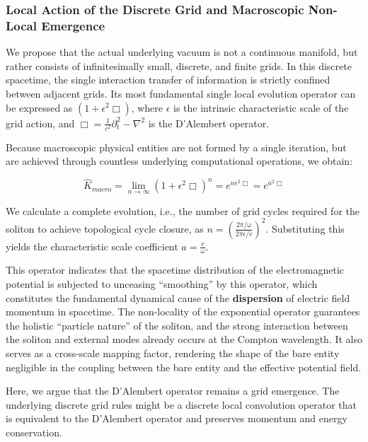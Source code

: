 \documentclass[12pt, a4paper]{article}
\begin{document}
\subsubsection{Local Action of the Discrete Grid and Macroscopic Non-Local Emergence}

We propose that the actual underlying vacuum is not a continuous manifold, but rather consists of infinitesimally small, discrete, and finite grids. In this discrete spacetime, the single interaction transfer of information is strictly confined between adjacent grids. Its most fundamental single local evolution operator can be expressed as $(1 + \epsilon^2\Box)$, where $\epsilon$ is the intrinsic characteristic scale of the grid action, and $\Box = \frac{1}{c^2}\partial_t^2 - \nabla^2$ is the D'Alembert operator.

Because macroscopic physical entities are not formed by a single iteration, but are achieved through countless underlying computational operations, we obtain:

\begin{equation}
\hat{K}_{macro} = \lim_{n\to\infty}  (1 + \epsilon^2 \Box)^n = e^{ n \epsilon^2 \Box} = e^{a^2 \Box} 
\end{equation}

We calculate a complete evolution, i.e., the number of grid cycles required for the soliton to achieve topological cycle closure, as $n = \left(\frac {2 \pi / \omega} { 2 \pi \epsilon / c}\right)^2$. Substituting this yields the characteristic scale coefficient $a = \frac{c}{\omega}$.

This operator indicates that the spacetime distribution of the electromagnetic potential is subjected to unceasing ``smoothing'' by this operator, which constitutes the fundamental dynamical cause of the \textbf{dispersion} of electric field momentum in spacetime. The non-locality of the exponential operator guarantees the holistic ``particle nature'' of the soliton, and the strong interaction between the soliton and external modes already occurs at the Compton wavelength. It also serves as a cross-scale mapping factor, rendering the shape of the bare entity negligible in the coupling between the bare entity and the effective potential field.

Here, we argue that the D'Alembert operator remains a grid emergence. The underlying discrete grid rules might be a discrete local convolution operator that is equivalent to the D'Alembert operator and preserves momentum and energy conservation.
\end{document}
